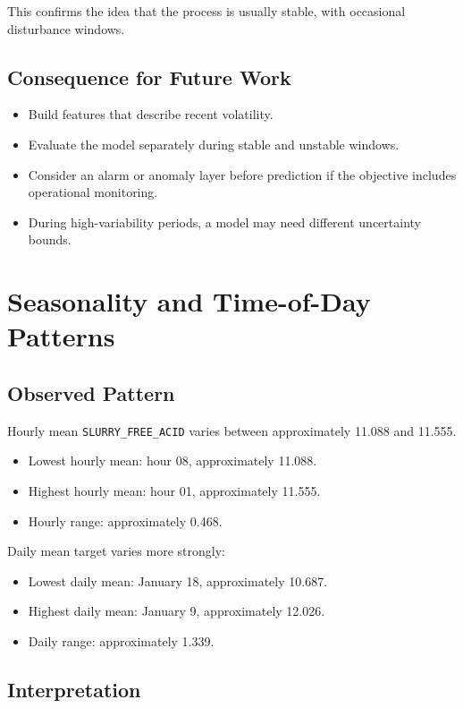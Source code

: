 \documentclass[11pt,a4paper]{article}
\begin{document}
This confirms the idea that the process is usually stable, with occasional disturbance windows.

\subsection{Consequence for Future Work}

\begin{itemize}
    \item Build features that describe recent volatility.
    \item Evaluate the model separately during stable and unstable windows.
    \item Consider an alarm or anomaly layer before prediction if the objective includes operational monitoring.
    \item During high-variability periods, a model may need different uncertainty bounds.
\end{itemize}

\section{Seasonality and Time-of-Day Patterns}

\subsection{Observed Pattern}

Hourly mean \texttt{SLURRY\_FREE\_ACID} varies between approximately 11.088 and 11.555.

\begin{itemize}
    \item Lowest hourly mean: hour 08, approximately 11.088.
    \item Highest hourly mean: hour 01, approximately 11.555.
    \item Hourly range: approximately 0.468.
\end{itemize}

Daily mean target varies more strongly:

\begin{itemize}
    \item Lowest daily mean: January 18, approximately 10.687.
    \item Highest daily mean: January 9, approximately 12.026.
    \item Daily range: approximately 1.339.
\end{itemize}

\subsection{Interpretation}
\end{document}
